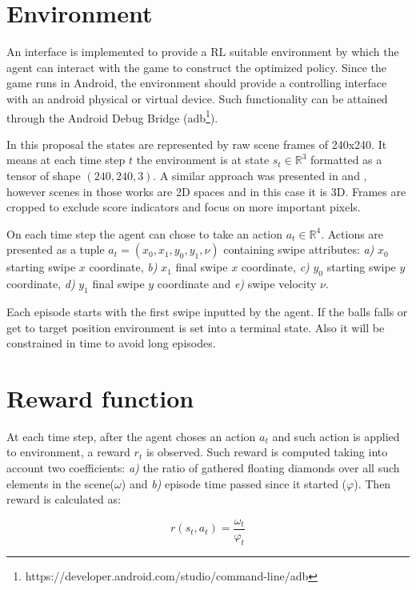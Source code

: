 \documentclass[peerreview]{IEEEtran}
\begin{document}
   \section{Environment}
   
	An interface is implemented to provide a RL suitable environment by which the agent can interact with the game to construct the optimized policy. Since the game runs in Android, the environment should provide a controlling interface with an android physical or virtual device. Such functionality can be attained through the Android Debug Bridge (adb\footnote{https://developer.android.com/studio/command-line/adb}). 
	
	In this proposal the states are represented by raw scene frames of 240x240. It means at each time step $t$ the environment is at state $s_t \in \mathbb{R}^3$ formatted as a tensor of shape $(240, 240, 3)$. A similar approach was presented in \cite{ddpg_2015} and \cite{replay_buffer_2015}, however scenes in those works are 2D spaces and in this case it is 3D. Frames are cropped to exclude score indicators and focus on more important pixels.
	
	On each time step the agent can chose to take an action $a_t \in \mathbb{R}^4$. Actions are presented as a tuple $a_t=(x_0, x_1, y_0, y_1, \nu)$ containing swipe attributes: \textit{a)} $x_0$ starting swipe $x$ coordinate, \textit{b)} $x_1$ final swipe $x$ coordinate, \textit{c)} $y_0$ starting swipe $y$ coordinate, \textit{d)} $y_1$ final swipe $y$ coordinate and \textit{e)} swipe velocity $\nu$.
	
	Each episode starts with the first swipe inputted by the agent. If the balls falls or get to target position environment is set into a terminal state. Also it will be constrained in time to avoid long episodes. 
	
	\section{Reward function}
	
	At each time step, after the agent choses an action $a_t$ and such action is applied to environment, a reward $r_t$ is observed. Such reward is computed taking into account two coefficients: \textit{a)} the ratio of gathered floating diamonds over all such elements in the scene($\omega$) and \textit{b)} episode time passed since it started ($\varphi$). Then reward is calculated as:
	
	\begin{equation}
	  r(s_t, a_t) = \dfrac{\omega_t}{\varphi_t}
	\end{equation}
	
\end{document}
